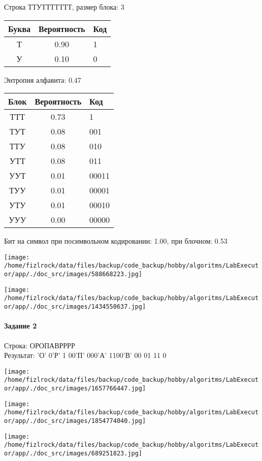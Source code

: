 \documentclass[a4paper, 12pt]{article}
\begin{document}
Строка ТТУТТТТТТТ, размер блока: 3
\begin{center}
 \begin{tabular}{ |c|c|l| } 
  \hline
     Буква & Вероятность & Код\\ \hline
Т & 0.90 & 1\\\hline
У & 0.10 & 0
\\ \hline \end{tabular}
\end{center}
Энтропия алфавита: 0.47
\begin{center}
 \begin{tabular}{ |c|c|l| } 
  \hline
     Блок & Вероятность & Код\\ \hline
ТТТ & 0.73 & 1\\\hline
ТУТ & 0.08 & 001\\\hline
ТТУ & 0.08 & 010\\\hline
УТТ & 0.08 & 011\\\hline
УУТ & 0.01 & 00011\\\hline
ТУУ & 0.01 & 00001\\\hline
УТУ & 0.01 & 00010\\\hline
УУУ & 0.00 & 00000
\\ \hline \end{tabular}
\end{center}
Бит на символ при посимвольном кодировании: 1.00, при блочном: 0.53

\texttt{[image: /home/fizlrock/data/files/backup/code\_backup/hobby/algoritms/LabExecutor/app/./doc\_src/images/588668223.jpg]}

\texttt{[image: /home/fizlrock/data/files/backup/code\_backup/hobby/algoritms/LabExecutor/app/./doc\_src/images/1434550637.jpg]}
\pagebreak
\paragraph{Задание 2}

Строка: 
ОРОПАВРРРР\\
Результат: 'О' 0'Р' 1 00'П' 000'А' 1100'В' 00 01 11 0

\texttt{[image: /home/fizlrock/data/files/backup/code\_backup/hobby/algoritms/LabExecutor/app/./doc\_src/images/1657766447.jpg]}

\texttt{[image: /home/fizlrock/data/files/backup/code\_backup/hobby/algoritms/LabExecutor/app/./doc\_src/images/1854774040.jpg]}

\texttt{[image: /home/fizlrock/data/files/backup/code\_backup/hobby/algoritms/LabExecutor/app/./doc\_src/images/689251823.jpg]}
\end{document}

